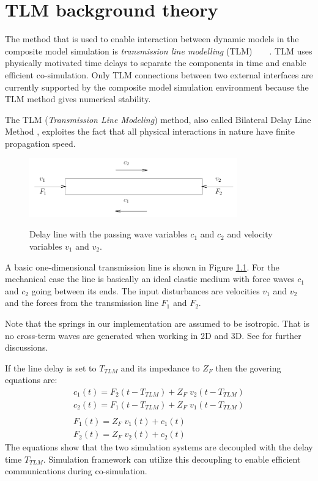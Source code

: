 \chapter{TLM background theory}
\label{secTLMtheory}
The method that is used to enable interaction between dynamic models in the composite model simulation is \emph{transmission line modelling} (TLM)~\cite{Johns-80}~\cite{KrusModMech-99}~\cite{KrusDistrSim}~\cite{Cogan-06}.
TLM uses physically motivated time delays to separate the components in time and enable efficient co-simulation. 
Only TLM connections between two external interfaces are currently supported by the composite model simulation environment because the TLM method gives numerical stability.


The TLM (\emph{Transmission Line Modeling}) method, also called Bilateral Delay Line Method \cite{Johns-80}, exploites the fact that all physical interactions in nature have finite propagation speed.
\begin{figure}
\begin{center}
   {\includegraphics[width=9cm]{figs/TLMline.png}}
\caption{Delay line with the passing wave variables $c_1$ and $c_2$
and velocity variables $v_1$ and $v_2$.}
\end{center}
\label{figTLMline}
\end{figure}

A basic one-dimensional transmission line is shown in Figure \ref{figTLMline}.
For the mechanical case the line is basically an ideal elastic medium with force waves $c_1$ and $c_2$ going between its ends. 
The input disturbances are velocities $v_1$ and $v_2$ and the forces from the transmission line $F_1$ and $F_2$.

Note that the springs in our implementation are assumed to be isotropic.
That is no cross-term waves are generated when working in 2D and 3D. 
See \cite{KrusModMech-99} for further discussions.

If the line delay is set to $T_{TLM}$ and its impedance to $Z_F$ then the govering equations are:
\begin{equation}
\begin{array}{l}
c_1(t) = F_2(t-T_{TLM})+ Z_F \; v_2(t-T_{TLM})\\
c_2(t) = F_1(t-T_{TLM})+ Z_F \; v_1(t-T_{TLM})\\
\\
F_1(t) = Z_F \; v_1(t) + c_1(t) \\
F_2(t) = Z_F \; v_2(t) + c_2(t)
\end{array}
\label{eqTLM}
\end{equation}
The equations show that the two simulation systems are decoupled with the delay time $T_{TLM}$. Simulation framework can utilize this decoupling to enable efficient communications during co-simulation. 

